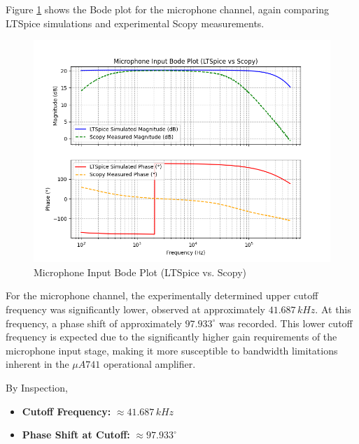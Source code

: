 \documentclass[12pt]{article}
\begin{document}
Figure \ref{fig:mic_bode} shows the Bode plot for the microphone channel, again comparing LTSpice simulations and experimental Scopy measurements.

\begin{figure}[H]
	\centering
	\includegraphics[width=15cm]{dp_mic}
	\caption{Microphone Input Bode Plot (LTSpice vs. Scopy)}
	\label{fig:mic_bode}
\end{figure}

For the microphone channel, the experimentally determined upper cutoff frequency
was significantly lower, observed at approximately $41.687\,kHz$. At this
frequency, a phase shift of approximately $97.933^\circ$ was recorded. This lower cutoff frequency is expected due to the significantly higher gain requirements of the microphone input stage, making it more susceptible to bandwidth limitations inherent in the $\mu A741$ operational amplifier.

By Inspection,
\begin{itemize}
	\item \textbf{Cutoff Frequency:} $\approx 41.687\,kHz$
	\item \textbf{Phase Shift at Cutoff:} $\approx 97.933^\circ$
\end{itemize}
\end{document}
